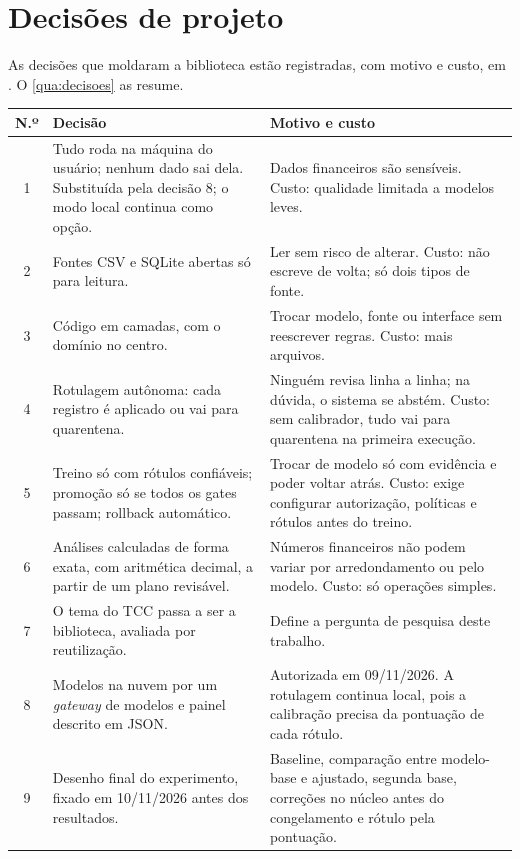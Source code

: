 \section{Decisões de projeto}
\label{sec:decisoes}

As decisões que moldaram a biblioteca estão registradas, com motivo e custo, em . O \autoref{qua:decisoes} as resume.

\begin{quadro}[htb]
  \caption{Decisões de projeto}
  \label{qua:decisoes}
  \small
  \begin{tabularx}{\textwidth}{|c|X|X|}
    \hline
    \textbf{N.º} & \textbf{Decisão} & \textbf{Motivo e custo} \\ \hline
    1 & Tudo roda na máquina do usuário; nenhum dado sai dela. Substituída pela decisão 8; o modo local continua como opção. & Dados financeiros são sensíveis. Custo: qualidade limitada a modelos leves. \\ \hline
    2 & Fontes CSV e SQLite abertas só para leitura. & Ler sem risco de alterar. Custo: não escreve de volta; só dois tipos de fonte. \\ \hline
    3 & Código em camadas, com o domínio no centro. & Trocar modelo, fonte ou interface sem reescrever regras. Custo: mais arquivos. \\ \hline
    4 & Rotulagem autônoma: cada registro é aplicado ou vai para quarentena. & Ninguém revisa linha a linha; na dúvida, o sistema se abstém. Custo: sem calibrador, tudo vai para quarentena na primeira execução. \\ \hline
    5 & Treino só com rótulos confiáveis; promoção só se todos os gates passam; rollback automático. & Trocar de modelo só com evidência e poder voltar atrás. Custo: exige configurar autorização, políticas e rótulos antes do treino. \\ \hline
    6 & Análises calculadas de forma exata, com aritmética decimal, a partir de um plano revisável. & Números financeiros não podem variar por arredondamento ou pelo modelo. Custo: só operações simples. \\ \hline
    7 & O tema do TCC passa a ser a biblioteca, avaliada por reutilização. & Define a pergunta de pesquisa deste trabalho. \\ \hline
    8 & Modelos na nuvem por um \emph{gateway} de modelos e painel descrito em JSON. & Autorizada em 09/11/2026. A rotulagem continua local, pois a calibração precisa da pontuação de cada rótulo. \\ \hline
    9 & Desenho final do experimento, fixado em 10/11/2026 antes dos resultados. & Baseline, comparação entre modelo-base e ajustado, segunda base, correções no núcleo antes do congelamento e rótulo pela pontuação. \\ \hline
  \end{tabularx}
\end{quadro}


